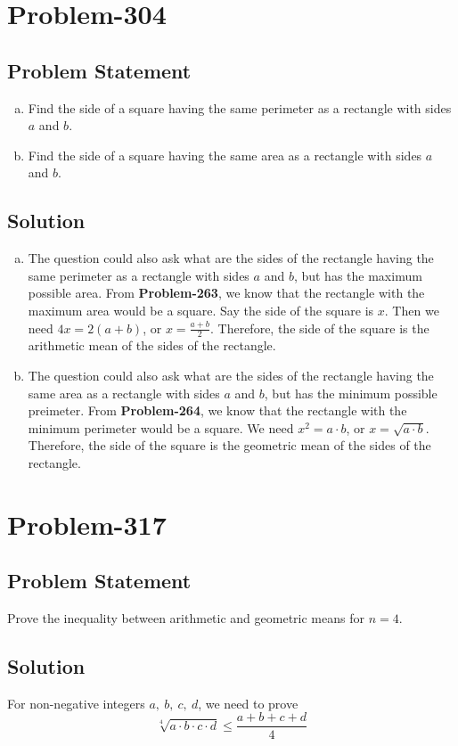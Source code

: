 \documentclass{article}
\begin{document}
\section*{Problem-304}
\subsection*{Problem Statement}
\begin{enumerate}[(a)]
	\item Find the side of a square having the same perimeter as a rectangle with sides $a$ and $b$.
	\item Find the side of a square having the same area as a rectangle with sides $a$ and $b$.
\end{enumerate}

\subsection*{Solution}
\begin{enumerate}[(a)]
	\item The question could also ask what are the sides of the rectangle having the same perimeter as a rectangle with sides $a$ and $b$, but has the maximum possible area. From \textbf{Problem-263}, we know that the rectangle with the maximum area would be a square.  Say the side of the square is $x$. Then we need $4x = 2(a+b)$, or $x = \frac{a+b}{2}$. Therefore, the side of the square is the arithmetic mean of the sides of the rectangle.
	\item The question could also ask what are the sides of the rectangle having the same area as a rectangle with sides $a$ and $b$, but has the minimum possible preimeter. From \textbf{Problem-264}, we know that the rectangle with the minimum perimeter would be a square. We need $x^2 = a \cdot b$, or $x = \sqrt{a \cdot b}$. Therefore, the side of the square is the geometric mean of the sides of the rectangle.
\end{enumerate}

\section*{Problem-317}
\subsection*{Problem Statement}
Prove the inequality between arithmetic and geometric means for $n = 4$.

\subsection*{Solution}
For non-negative integers $a,\ b,\ c,\ d$, we need to prove
\[
	\sqrt[4]{a \cdot b \cdot c \cdot d} \leq \frac{a+b+c+d}{4}
\]
\end{document}
